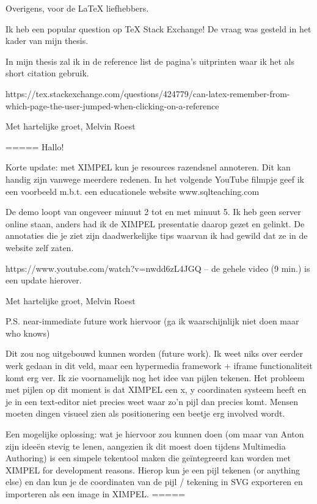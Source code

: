 Overigens, voor de LaTeX liefhebbers.

Ik heb een popular question op TeX Stack Exchange! De vraag was gesteld in het kader van mijn thesis.

In mijn thesis zal ik in de reference list de pagina's uitprinten waar ik het als short citation gebruik.

https://tex.stackexchange.com/questions/424779/can-latex-remember-from-which-page-the-user-jumped-when-clicking-on-a-reference

Met hartelijke groet,
Melvin Roest

=====
Hallo!

Korte update: met XIMPEL kun je resources razendsnel annoteren. Dit kan handig zijn vanwege meerdere redenen. In het volgende YouTube filmpje geef ik een voorbeeld m.b.t. een educationele website www.sqlteaching.com

De demo loopt van ongeveer minuut 2 tot en met minuut 5. Ik heb geen server online staan, anders had ik de XIMPEL presentatie daarop gezet en gelinkt. De annotaties die je ziet zijn daadwerkelijke tips waarvan ik had gewild dat ze in de website zelf zaten.

https://www.youtube.com/watch?v=nwdd6zL4JGQ -- de gehele video (9 min.) is een update hierover.

Met hartelijke groet,
Melvin Roest

P.S. near-immediate future work hiervoor (ga ik waarschijnlijk niet doen maar who knows)

Dit zou nog uitgebouwd kunnen worden (future work). Ik weet niks over eerder werk gedaan in dit veld, maar een hypermedia framework + iframe functionaliteit komt erg ver. Ik zie voornamelijk nog het idee van pijlen tekenen. Het probleem met pijlen op dit moment is dat XIMPEL een x, y coordinaten systeem heeft en je in een text-editor niet precies weet waar zo'n pijl dan precies komt. Mensen moeten dingen visueel zien als positionering een beetje erg involved wordt.

Een mogelijke oplossing: wat je hiervoor zou kunnen doen (om maar van Anton zijn ideeën stevig te lenen, aangezien ik dit moest doen tijdens Multimedia Authoring) is een simpele tekentool maken die geïntegreerd kan worden met XIMPEL for development reasons. Hierop kun je een pijl tekenen (or anything else) en dan kun je de coordinaten van de pijl / tekening in SVG exporteren en importeren als een image in XIMPEL.
=====